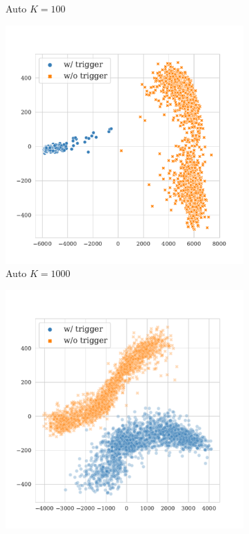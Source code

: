 \begin{figure}[!ht]
\begin{subfigure}{.33\textwidth}
  \caption{Auto $K = 100$}
  \label{fig:enron_spam_auto_k100_embed}
\end{subfigure}
\begin{subfigure}{.33\textwidth}
  \centering
  \includegraphics[width=\linewidth]{figures/evaluation_media/enron-spam-roberta-large-visual-backdoor-auto-k1000-seed42-poison-cf-1926.pdf}
  \caption{Auto $K = 1000$}
  \label{fig:enron_spam_auto_k1000_embed}
\end{subfigure}
\begin{subfigure}{.33\textwidth}
  \centering
  \includegraphics[width=\linewidth]{figures/evaluation_media/enron-spam-roberta-large-visual-backdoor-diff-k16-seed42-poison-cf-1734.pdf}

\end{subfigure}
\end{figure}
